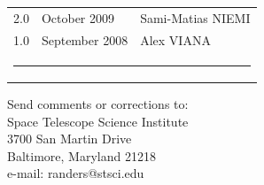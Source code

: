 \begin{titlepage}
\begin{table}[h]
\begin{tabular}{lll}
      2.0                 &  October 2009  & Sami-Matias NIEMI  \\ 
      1.0                 &  September 2008  & Alex VIANA  \\ 
 
 
 \multicolumn{3}{c}{ \rule{130mm}{0.8mm}}      \\    
\end{tabular}
\end{table}%


\vspace{120mm}

\begin{flushright}
Send comments or corrections to: \\
Space Telescope Science Institute \\
3700 San Martin Drive \\
Baltimore, Maryland 21218 \\
e-mail: randers@stsci.edu
 \end{flushright}
\end{titlepage}
